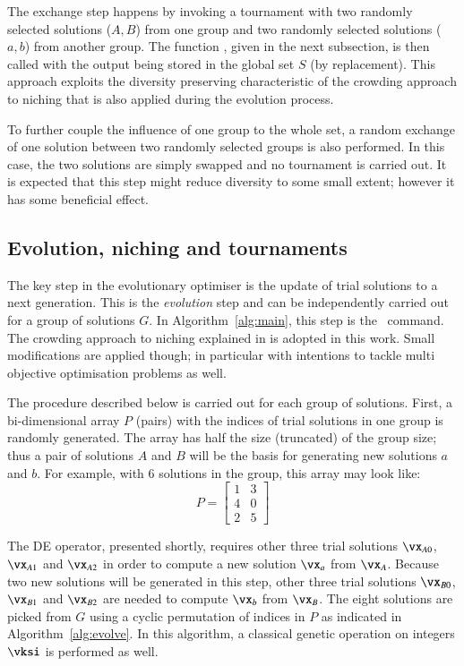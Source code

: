\documentclass[final,5p,times,twocolumn]{elsarticle}
\begin{document}
The exchange step happens by invoking a tournament with two randomly selected solutions ($A,B$) from
one group and two randomly selected solutions ($a,b$) from another group. The function
\FnTournament, given in the next subsection, is then called with the output being stored in the
global set $S$ (by replacement). This approach exploits the diversity preserving characteristic of
the crowding approach to niching that is also applied during the evolution process.

To further couple the influence of one group to the whole set, a random exchange of one solution
between two randomly selected groups is also performed. In this case, the two solutions are simply
swapped and no tournament is carried out. It is expected that this step might reduce diversity to
some small extent; however it has some beneficial effect.



\subsection{Evolution, niching and tournaments}
\label{sec:evolution}

The key step in the evolutionary optimiser is the update of trial solutions to a next generation.
This is the \emph{evolution} step and can be independently carried out for a group of solutions $G$.
In Algorithm~\ref{alg:main}, this step is the \FnEvolveOneGroup~command. The crowding approach to
niching explained in \citep{meng:08} is adopted in this work. Small modifications are applied though;
in particular with intentions to tackle multi objective optimisation problems as well.

The procedure described below is carried out for each group of solutions. First, a bi-dimensional
array $P$ (pairs) with the indices of trial solutions in one group is randomly generated. The array
has half the size (truncated) of the group size; thus a pair of solutions $A$ and $B$ will be the
basis for generating new solutions $a$ and $b$. For example, with 6 solutions in the group, this
array may look like:
\begin{equation}
    P = \begin{bmatrix}
        1 & 3 \\
        4 & 0 \\
        2 & 5
    \end{bmatrix}
\end{equation}

The DE operator, presented shortly, requires other three trial solutions $\vx_{A0}$, $\vx_{A1}$ and
$\vx_{A2}$ in order to compute a new solution $\vx_a$ from $\vx_A$. Because two new solutions will
be generated in this step, other three trial solutions $\vx_{B0}$, $\vx_{B1}$ and $\vx_{B2}$ are
needed to compute $\vx_b$ from $\vx_B$. The eight solutions are picked from $G$ using a cyclic
permutation of indices in $P$ as indicated in Algorithm~\ref{alg:evolve}. In this algorithm, a
classical genetic operation on integers $\vksi$ is performed as well.
\end{document}
